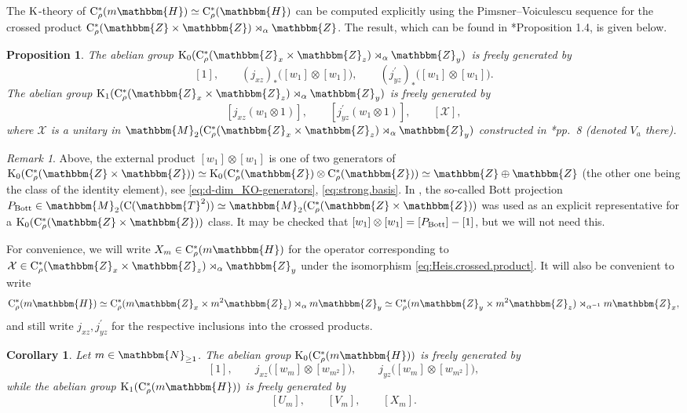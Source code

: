 \documentclass{amsart}
\numberwithin{figure}{section}
\numberwithin{equation}{section}
\numberwithin{table}{section}
\theoremstyle{plain}
\newtheorem{proposition}[equation]{Proposition}
\newtheorem{corollary}[equation]{Corollary}
\theoremstyle{definition}
\theoremstyle{remark}
\newtheorem{remark}[equation]{Remark}
\theoremstyle{nonumber}
\newcommand{\N}{\mathbb{N}}
\newcommand{\Z}{\mathbb{Z}}
\newcommand{\T}{\mathbb{T}}
\newcommand{\Mat}{\mathbb{M}}
\newcommand{\HH}{\mathbb{H}} %
\newcommand{\K}{\relax\ifmmode\operatorname{K}\else\textup{K}\fi}
\newcommand{\Cst}{\relax\ifmmode\mathrm{C}^*\else\textup{C*}\fi}
\newcommand{\Cont}{\mathrm{C}}
\newcommand{\Cstr}{\Cst_\rho} %
\renewcommand{\mathbb}{\mathbbm} %
\begin{document}
The $\K$-theory of $\Cstr(m\HH)\simeq\Cstr(\HH)$ can be computed explicitly
using the Pimsner--Voiculescu sequence for the crossed product
$\Cstr(\Z\times\Z)\rtimes_\alpha\Z$. The result, which can be found in
\cite{Anderson-Paschke:Rotation_algebra}*{Proposition 1.4}, is given below.
\begin{proposition}\label{prop:Heis.standard.K.groups}
The abelian group $\K_0(\Cstr(\Z_x\times \Z_z)\rtimes_{\alpha}\Z_y)$ is freely generated by
\[
[1],\qquad (j_{xz})_*\big([w_1]\otimes [w_1]\big),\qquad (j^\prime_{yz})_*\big([w_1]\otimes [w_1]\big).
\]
The abelian group $\K_1(\Cstr(\Z_x\times \Z_z)\rtimes_{\alpha}\Z_y)$ is freely generated by
\[
[j_{xz}(w_1\otimes 1)],\qquad [j_{yz}^\prime(w_1\otimes 1)],\qquad [\mathcal{X}],
\]
where $\mathcal{X}$ is a unitary in $\Mat_2(\Cstr(\Z_x\times \Z_z)\rtimes_{\alpha}\Z_y)$ constructed in \cite{Anderson-Paschke:Rotation_algebra}*{pp.~8} (denoted $V_a$ there).
\end{proposition}


\begin{remark}
Above, the external product $[w_1]\otimes[w_1]$ is one of two generators of $\K_0(\Cstr(\Z\times\Z))\simeq\K_0(\Cstr(\Z)\otimes \Cstr(\Z))\simeq\Z\oplus\Z$ (the other one being the class of the identity element), see \eqref{eq:d-dim_KO-generators}, \eqref{eq:strong.basis}. In \cite{Anderson-Paschke:Rotation_algebra}, the so-called Bott projection $P_{\rm Bott}\in\Mat_2(\Cont(\T^2))\simeq\Mat_2(\Cstr(\Z\times\Z))$ was used as an explicit representative for a $\K_0(\Cstr(\Z\times\Z))$ class. It may be checked that $[w_1]\otimes [w_1]=[P_{\rm Bott}]-[1]$, but we will not need this.
\end{remark}


For convenience, we will write $X_m\in\Cstr(m\HH)$ for the operator corresponding to \mbox{$\mathcal{X}\in \Cstr(\Z_x\times\Z_z)\rtimes_\alpha\Z_y$} under the isomorphism \eqref{eq:Heis.crossed.product}. It will also be convenient to write
\[
\Cstr(m\HH)\simeq \Cstr(m\Z_x\times m^2\Z_z)\rtimes_\alpha m\Z_y \simeq \Cstr(m\Z_y\times m^2\Z_z)\rtimes_{\alpha^{-1}} m\Z_x,
\]
and still write $j_{xz}, j_{yz}^\prime$ for the respective inclusions into the crossed products.


\begin{corollary}\label{cor:Heis.standard.K.groups}
Let $m\in\N_{\geq 1}$. The abelian group $\K_0(\Cstr(m\HH))$ is freely generated by
\[
[1],\qquad j_{xz}\big([w_{m}]\otimes [w_{m^2}]\big),\qquad j_{yz}\big([w_{m}]\otimes [w_{m^2}]\big),
\]
while the abelian group $\K_1(\Cstr(m\HH))$ is freely generated by
\[
[U_m],\qquad [V_m],\qquad [X_m].
\]
\end{corollary}
\end{document}
